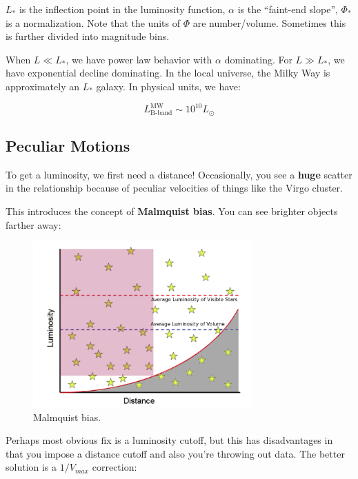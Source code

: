 \documentclass{article}
\begin{document}
$L_*$ is the inflection point in the luminosity function, $\alpha$ is the ``faint-end slope'', $\Phi_*$ is a normalization. Note that the units of $\Phi$ are number/volume. Sometimes this is further divided into magnitude bins. 

When $L \ll L_*$, we have power law behavior with $\alpha$ dominating. For $L \gg L_*$, we have exponential decline dominating. In the local universe, the Milky Way is approximately an $L_*$ galaxy. In physical units, we have:

\begin{equation}
    L_\text{B-band}^\text{MW} \sim 10^{10} L_\odot
\end{equation}

\subsection{Peculiar Motions}

To get a luminosity, we first need a distance! Occasionally, you see a \textbf{huge} scatter in the relationship because of peculiar velocities of things like the Virgo cluster. 

This introduces the concept of \textbf{Malmquist bias}. You can see brighter objects farther away:

\begin{figure}
    \centering
    \includegraphics[width=0.75\textwidth]{figs/Screen Shot 2021-09-03 at 11.31.27 AM.png}
    \caption{Malmquist bias. }
    \label{fig:malm}
\end{figure}

Perhaps most obvious fix is a luminosity cutoff, but this has disadvantages in that you impose a distance cutoff and also you're throwing out data. The better solution is a $1/V_{max}$ correction:
\end{document}
